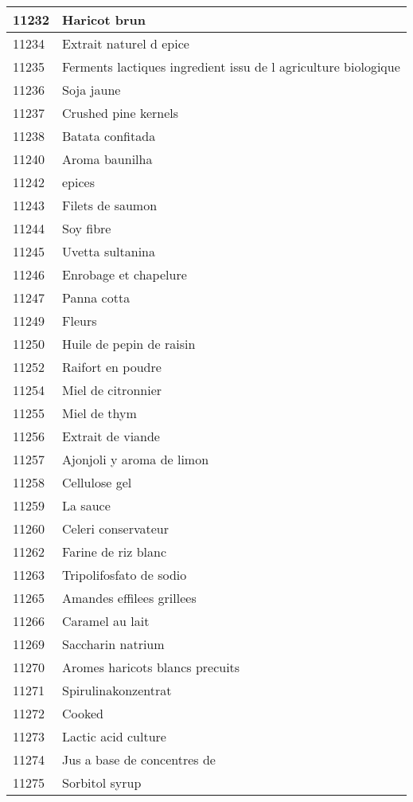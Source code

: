 \begin{longtable}{|l|l|}
11232 & Haricot brun \\ \hline 
11234 & Extrait naturel d epice \\ \hline 
11235 & Ferments lactiques  ingredient issu de l agriculture biologique \\ \hline 
11236 & Soja jaune \\ \hline 
11237 & Crushed pine kernels \\ \hline 
11238 & Batata confitada \\ \hline 
11240 & Aroma baunilha \\ \hline 
11242 & epices \\ \hline 
11243 & Filets de saumon \\ \hline 
11244 & Soy fibre \\ \hline 
11245 & Uvetta sultanina \\ \hline 
11246 & Enrobage et chapelure \\ \hline 
11247 & Panna cotta \\ \hline 
11249 & Fleurs \\ \hline 
11250 & Huile de pepin de raisin \\ \hline 
11252 & Raifort en poudre \\ \hline 
11254 & Miel de citronnier \\ \hline 
11255 & Miel de thym \\ \hline 
11256 & Extrait de viande \\ \hline 
11257 & Ajonjoli y aroma de limon \\ \hline 
11258 & Cellulose gel \\ \hline 
11259 & La sauce \\ \hline 
11260 & Celeri conservateur \\ \hline 
11262 & Farine de riz blanc \\ \hline 
11263 & Tripolifosfato de sodio \\ \hline 
11265 & Amandes effilees grillees \\ \hline 
11266 & Caramel au lait \\ \hline 
11269 & Saccharin natrium \\ \hline 
11270 & Aromes haricots blancs precuits \\ \hline 
11271 & Spirulinakonzentrat \\ \hline 
11272 & Cooked \\ \hline 
11273 & Lactic acid culture \\ \hline 
11274 & Jus a base de concentres de \\ \hline 
11275 & Sorbitol syrup \\ \hline 

\end{longtable}
